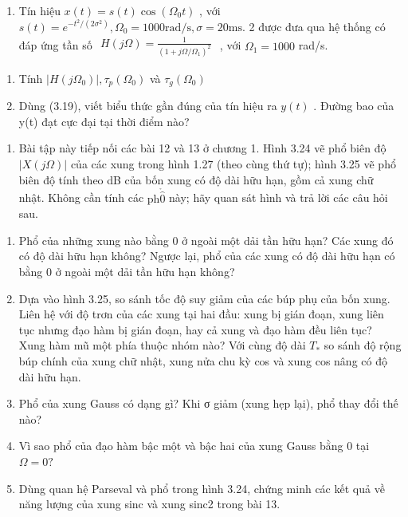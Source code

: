 \documentclass[
  10
]{article}
\providecommand{\tightlist}{%
  \setlength{\itemsep}{0pt}\setlength{\parskip}{0pt}}
\begin{document}
\begin{enumerate}
\def\labelenumi{\arabic{enumi}.}
\setcounter{enumi}{15}
\tightlist
\item
  Tín hiệu \(x ( t ) = s ( t ) \cos ( \Omega _ { 0 } t )\) , với
  \(s ( t ) = e ^ { - t ^ { 2 } / ( 2 \sigma ^ { 2 } ) } , \Omega _ { 0 } = 1 0 0 0 \mathrm { r a d / s } , \sigma = 2 0 \mathrm { m s } .\)
  2 được đưa qua hệ thống có đáp ứng tần số
  \(\begin{array} { r } { H ( j \Omega ) = \frac { 1 } { ( 1 + j \Omega / \Omega _ { 1 } ) ^ { 2 } } } \end{array}\)
  , với \(\Omega _ { 1 } = 1 0 0 0\) rad/s.
\end{enumerate}

\begin{enumerate}
\def\labelenumi{(\alph{enumi})}
\item
  Tính \(| H ( j \Omega _ { 0 } ) | , \tau _ { p } ( \Omega _ { 0 } )\)
  và \(\tau _ { g } ( \Omega _ { 0 } )\)
\item
  Dùng (3.19), viết biểu thức gần đúng của tín hiệu ra \(y ( t )\) .
  Đường bao của y(t) đạt cực đại tại thời điểm nào?
\end{enumerate}

\begin{enumerate}
\def\labelenumi{\arabic{enumi}.}
\setcounter{enumi}{16}
\tightlist
\item
  Bài tập này tiếp nối các bài 12 và 13 ở chương 1. Hình 3.24 vẽ phổ
  biên độ \(| X ( j \Omega ) |\) của các xung trong hình 1.27 (theo cùng
  thứ tự); hình 3.25 vẽ phổ biên độ tính theo dB của bốn xung có độ dài
  hữu hạn, gồm cả xung chữ nhật. Không cần tính các
  \(\mathrm { p h } \mathring { \hat { 0 } }\) này; hãy quan sát hình và
  trả lời các câu hỏi sau.
\end{enumerate}

\begin{enumerate}
\def\labelenumi{(\alph{enumi})}
\item
  Phổ của những xung nào bằng 0 ở ngoài một dải tần hữu hạn? Các xung đó
  có độ dài hữu hạn không? Ngược lại, phổ của các xung có độ dài hữu hạn
  có bằng 0 ở ngoài một dải tần hữu hạn không?
\item
  Dựa vào hình 3.25, so sánh tốc độ suy giảm của các búp phụ của bốn
  xung. Liên hệ với độ trơn của các xung tại hai đầu: xung bị gián đoạn,
  xung liên tục nhưng đạo hàm bị gián đoạn, hay cả xung và đạo hàm đều
  liên tục? Xung hàm mũ một phía thuộc nhóm nào? Với cùng độ dài
  \(T _ { \ast }\) so sánh độ rộng búp chính của xung chữ nhật, xung nửa
  chu kỳ cos và xung cos nâng có độ dài hữu hạn.
\item
  Phổ của xung Gauss có dạng gì? Khi σ giảm (xung hẹp lại), phổ thay đổi
  thế nào?
\item
  Vì sao phổ của đạo hàm bậc một và bậc hai của xung Gauss bằng 0 tại
  \(\Omega = 0 ?\)
\item
  Dùng quan hệ Parseval và phổ trong hình 3.24, chứng minh các kết quả
  về năng lượng của xung sinc và xung sinc2 trong bài 13.
\end{enumerate}
\end{document}
